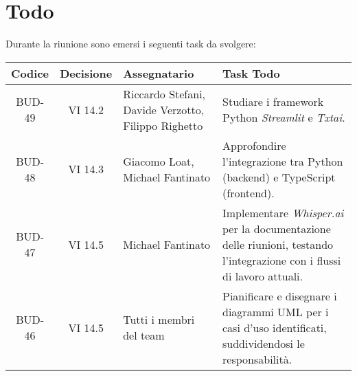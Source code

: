 \section{Todo}

Durante la riunione sono emersi i seguenti task da svolgere:

\vspace{0.5cm}

\begin{table}[htbp]
    \centering
    \begin{tabular}{|c|c|p{}|p{}|}
        \hline
        \rowcolor[gray]{0.75}
        \textbf{Codice} & \textbf{Decisione} & \textbf{Assegnatario} & \textbf{Task Todo} \\
        \hline
        BUD-49 & VI 14.2 & Riccardo Stefani, Davide Verzotto, Filippo Righetto & Studiare i framework Python \emph{Streamlit} e \emph{Txtai}. \\
        \hline
        BUD-48 & VI 14.3 & Giacomo Loat, Michael Fantinato & Approfondire l'integrazione tra Python (backend) e TypeScript (frontend). \\
        \hline
        BUD-47 & VI 14.5 & Michael Fantinato & Implementare \emph{Whisper.ai} per la documentazione delle riunioni, testando l'integrazione con i flussi di lavoro attuali. \\
        \hline
        BUD-46 & VI 14.5 & Tutti i membri del team & Pianificare e disegnare i diagrammi UML per i casi d'uso identificati, suddividendosi le responsabilità. \\
        \hline
    \end{tabular}
\end{table}
